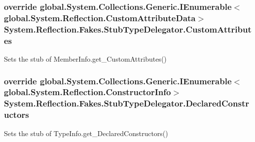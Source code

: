 \hypertarget{class_system_1_1_reflection_1_1_fakes_1_1_stub_type_delegator_afa3cabfb433630d47b82105d04ac4162}{
\subsubsection[{Custom\-Attributes}]{\setlength{\rightskip}{0pt plus 5cm}override global.\-System.\-Collections.\-Generic.\-I\-Enumerable$<$global.\-System.\-Reflection.\-Custom\-Attribute\-Data$>$ System.\-Reflection.\-Fakes.\-Stub\-Type\-Delegator.\-Custom\-Attributes\hspace{0.3cm}{\ttfamily [get]}}}\label{class_system_1_1_reflection_1_1_fakes_1_1_stub_type_delegator_afa3cabfb433630d47b82105d04ac4162}


Sets the stub of Member\-Info.\-get\-\_\-\-Custom\-Attributes()

\hypertarget{class_system_1_1_reflection_1_1_fakes_1_1_stub_type_delegator_ad028a98c04c8800043cf84c85fde9b62}{
\subsubsection[{Declared\-Constructors}]{\setlength{\rightskip}{0pt plus 5cm}override global.\-System.\-Collections.\-Generic.\-I\-Enumerable$<$global.\-System.\-Reflection.\-Constructor\-Info$>$ System.\-Reflection.\-Fakes.\-Stub\-Type\-Delegator.\-Declared\-Constructors\hspace{0.3cm}{\ttfamily [get]}}}\label{class_system_1_1_reflection_1_1_fakes_1_1_stub_type_delegator_ad028a98c04c8800043cf84c85fde9b62}


Sets the stub of Type\-Info.\-get\-\_\-\-Declared\-Constructors()

